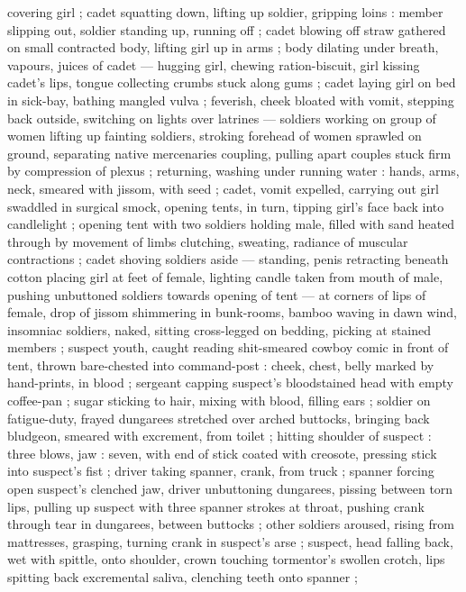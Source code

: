 covering girl ; cadet squatting down, lifting up soldier, gripping loins : member slipping out,
soldier standing up, running off ; cadet blowing off straw gathered on small contracted body,
lifting girl up in arms ; body dilating under breath, vapours, juices of cadet --- hugging girl,
chewing ration-biscuit, girl kissing cadet's lips, tongue collecting crumbs stuck along gums ; cadet
laying girl on bed in sick-bay, bathing mangled vulva ; feverish, cheek bloated with vomit, stepping
back outside, switching on lights over latrines --- soldiers working on group of women {\dashcom}
lifting up fainting soldiers, stroking forehead of women sprawled on ground, separating native
mercenaries coupling, pulling apart couples stuck firm by compression of plexus ; returning, washing
under running water : hands, arms, neck, smeared with jissom, with seed ; cadet, vomit expelled,
carrying out girl swaddled in surgical smock, opening tents, in turn, tipping girl's face back into
candlelight ; opening tent with two soldiers holding male, filled with sand heated through by
movement of limbs clutching, sweating, radiance of muscular contractions ; cadet shoving soldiers
aside --- standing, penis retracting beneath cotton %
{\dashcom} placing girl at feet of female, lighting candle taken from mouth of male, pushing
unbuttoned soldiers towards opening of tent --- at corners of lips of female, drop of jissom
shimmering {\semitrislash} in bunk-rooms, bamboo waving in dawn wind, insomniac soldiers, naked,
sitting cross-legged on bedding, picking at stained members ; suspect youth, caught reading
shit-smeared cowboy comic in front of tent, thrown bare-chested into command-post : cheek, chest,
belly marked by hand-prints, in blood ; sergeant capping suspect's bloodstained head with empty
coffee-pan ; sugar sticking to hair, mixing with blood, filling ears ; soldier on fatigue-duty,
frayed dungarees stretched over arched buttocks, bringing back bludgeon, smeared with excrement,
from toilet ; hitting shoulder of suspect : three blows, jaw : seven, with end of stick coated with
creosote, pressing stick into suspect's fist ; driver taking spanner, crank, from truck ; spanner
forcing open suspect's clenched jaw, driver unbuttoning dungarees, pissing between torn lips,
pulling up suspect with three spanner strokes at throat, pushing crank through tear in dungarees,
between buttocks ; other soldiers aroused, rising from mattresses, grasping, turning crank in
suspect's arse ; suspect, head falling back, wet with spittle, onto shoulder, crown touching
tormentor's swollen crotch, lips spitting back excremental saliva, clenching teeth onto spanner ;

